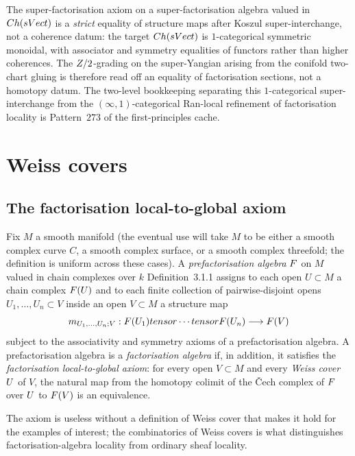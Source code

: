 The super-factorisation axiom on a super-factorisation algebra valued
in $Ch(sVect)$ is a \emph{strict} equality of structure maps after
Koszul super-interchange, not a coherence datum: the target
$Ch(sVect)$ is $1$-categorical symmetric monoidal, with associator and
symmetry equalities of functors rather than higher coherences. The
$Z/2$-grading on the super-Yangian arising from the conifold two-chart
gluing is therefore read off an equality of factorisation sections, not
a homotopy datum. The two-level bookkeeping separating this
$1$-categorical super-interchange from the $(\infty, 1)$-categorical
Ran-local refinement of factorisation locality is Pattern~$273$ of the
first-principles cache.

\section{Weiss covers}
\label{sec:fa-weiss-covers}

\subsection{The factorisation local-to-global axiom}

Fix $M$ a smooth manifold (the eventual use will take $M$ to be either
a smooth complex curve $C$, a smooth complex surface, or a smooth
complex threefold; the definition is uniform across these cases).
A \emph{prefactorisation algebra} $F$ on $M$ valued in chain
complexes over $k$ \cite{CostelloGwilliam} Definition~3.1.1 assigns to
each open $U \subset M$ a chain complex $F(U)$ and to each finite
collection of pairwise-disjoint opens $U_1, \dots, U_n \subset V$
inside an open $V \subset M$ a structure map
\begin{equation}
\label{eq:prefactorisation-structure-map}
  m_{U_1, \dots, U_n; V} :
  F(U_1) tensor \cdots tensor F(U_n) \longrightarrow F(V)
\end{equation}
subject to the associativity and symmetry axioms of a prefactorisation
algebra. A prefactorisation algebra is a \emph{factorisation algebra}
if, in addition, it satisfies the \emph{factorisation local-to-global
axiom}: for every open $V \subset M$ and every \emph{Weiss cover}
$U$ of $V$, the natural map from the homotopy colimit of the
Čech complex of $F$ over $U$ to $F(V)$ is an equivalence.

The axiom is useless without a definition of Weiss cover that makes it
hold for the examples of interest; the combinatorics of Weiss covers
is what distinguishes factorisation-algebra locality from ordinary
sheaf locality.


